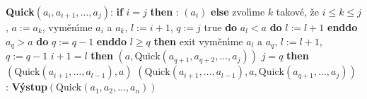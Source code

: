 {\bf Quick$\left(a_i,a_{i+1},\dots,a_j\right)$}:\newline 
{\bf if} $i=j$ {\bf then}\newline 
\phantom{---}{\bf V\'ystup}: $\left(a_i\right)$\newline 
{\bf else}\newline 
\phantom{---}zvol\'\i me $k$ takov\'e, \v ze $i\le k\le j$, $a:=a_k$,\newline 
\phantom{---}vym\v en\'\i me $a_i$ a $a_k$, $l:=i+1$, $q:=j$\newline 
\phantom{---}{\bf while} true {\bf do}\newline 
\phantom{------}{\bf while} $a_l<a$ {\bf do} $l:=l+1$ {\bf enddo}\newline 
\phantom{------}{\bf while} $a_q>a$ {\bf do} $q:=q-1$ {\bf enddo}\newline
\phantom{------}{\bf if} $l\ge q$ {\bf then}\newline 
\phantom{---------}exit\newline 
\phantom{------}{\bf else}\newline 
\phantom{---------}vym\v en\'\i me $a_l$ a $a_q$, $l:=l+1$, $q:=q-1$\newline 
\phantom{------}{\bf endif}\newline
\phantom{---}{\bf enddo}\newline 
\phantom{---}{\bf if} $i+1=l$ {\bf then}\newline 
\phantom{------}{\bf V\'ystup}$\left(a,\text{Quick}\left(a_{q+1},a_{q+2},\dots,a_j\right)\right)$\newline
\phantom{---}{\bf else}\newline 
\phantom{------}{\bf if} $j=q$ {\bf then}\newline 
\phantom{---------}{\bf V\'ystup}$\left(\text{Quick}\left(a_{i+1},\dots,a_{l-1}\right),a\right)$\newline \phantom{------}{\bf else}\newline 
\phantom{---------}{\bf V\'ystup}$\left(\text{Quick}\left(a_{i+1},\dots,a_{l-1}\right),a,\text{Quick}\left(a_{q+1},\dots,a_j\right)\right)$\newline 
\phantom{------}{\bf endif}\newline 
\phantom{---}{\bf endif\newline 
endif
\bigskip

QUICKSORT$\left(a_1,a_2,\dots,a_n\right)$}:\newline 
{\bf V\'ystup}$\left(\text{Quick}\left(a_1,a_2,\dots,a_n\right)\right)$
\bigskip

